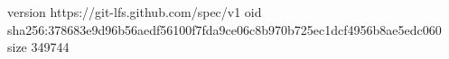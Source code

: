 version https://git-lfs.github.com/spec/v1
oid sha256:378683e9d96b56aedf56100f7fda9ce06c8b970b725ec1dcf4956b8ae5edc060
size 349744
